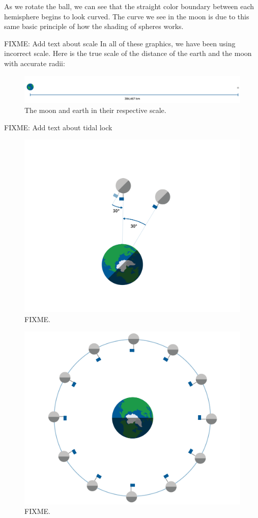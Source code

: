As we rotate the ball, we can see that the straight color boundary between each hemisphere begins to look curved. The curve we see in the moon is due to this same basic principle of how the shading of spheres works.    

FIXME: Add text about scale
In all of these graphics, we have been using incorrect scale. Here is the true scale of the distance of the earth and the moon with accurate radii:
\begin{figure}[htbp]
    \centering
    \includegraphics[width=.7\textwidth]{moonEarthScale.png}
    \caption{The moon and earth in their respective scale.}
    \label{fig:example}
\end{figure}


FIXME: Add text about tidal lock

\begin{figure}[htbp]
    \centering
    \includegraphics[width=.7\textwidth]{moonRotate.png}
    \caption{FIXME.}
    \label{fig:moonRotate}
\end{figure}
\begin{figure}[htbp]
    \centering
    \includegraphics[width=.7\textwidth]{moonCircleRotate.png}
    \caption{FIXME.}
    \label{fig:moonCircleRotate}
\end{figure}



